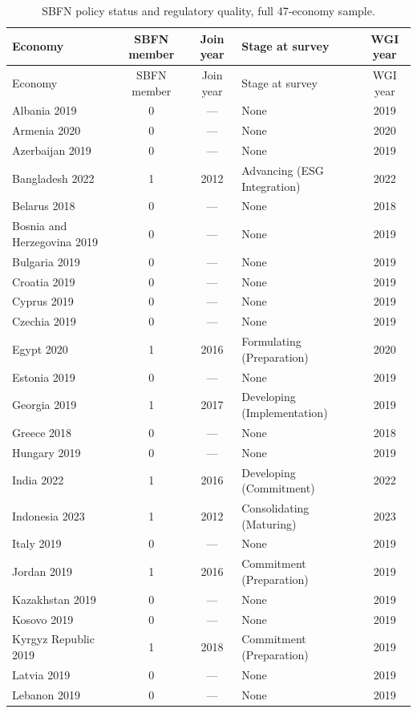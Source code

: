 \documentclass[12pt]{article}
\begin{document}
{\footnotesize
\begin{longtable}{p{2.3cm}ccp{4.0cm}c}
\caption{SBFN policy status and regulatory quality, full 47-economy sample.} \label{tab:appendixa} \\
\toprule
Economy & SBFN member & Join year & Stage at survey & WGI year \\
\midrule
\endfirsthead
\toprule
Economy & SBFN member & Join year & Stage at survey & WGI year \\
\midrule
\endhead
Albania 2019 & 0 & --- & None & 2019 \\
Armenia 2020 & 0 & --- & None & 2020 \\
Azerbaijan 2019 & 0 & --- & None & 2019 \\
Bangladesh 2022 & 1 & 2012 & Advancing (ESG Integration) & 2022 \\
Belarus 2018 & 0 & --- & None & 2018 \\
Bosnia and Herzegovina 2019 & 0 & --- & None & 2019 \\
Bulgaria 2019 & 0 & --- & None & 2019 \\
Croatia 2019 & 0 & --- & None & 2019 \\
Cyprus 2019 & 0 & --- & None & 2019 \\
Czechia 2019 & 0 & --- & None & 2019 \\
Egypt 2020 & 1 & 2016 & Formulating (Preparation) & 2020 \\
Estonia 2019 & 0 & --- & None & 2019 \\
Georgia 2019 & 1 & 2017 & Developing (Implementation) & 2019 \\
Greece 2018 & 0 & --- & None & 2018 \\
Hungary 2019 & 0 & --- & None & 2019 \\
India 2022 & 1 & 2016 & Developing (Commitment) & 2022 \\
Indonesia 2023 & 1 & 2012 & Consolidating (Maturing) & 2023 \\
Italy 2019 & 0 & --- & None & 2019 \\
Jordan 2019 & 1 & 2016 & Commitment (Preparation) & 2019 \\
Kazakhstan 2019 & 0 & --- & None & 2019 \\
Kosovo 2019 & 0 & --- & None & 2019 \\
Kyrgyz Republic 2019 & 1 & 2018 & Commitment (Preparation) & 2019 \\
Latvia 2019 & 0 & --- & None & 2019 \\
Lebanon 2019 & 0 & --- & None & 2019 \\

\end{longtable}}
\end{document}
